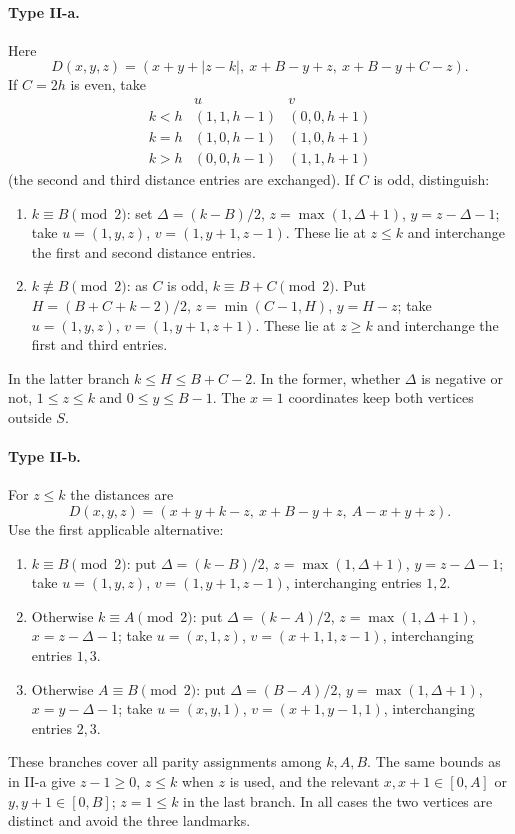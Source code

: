\documentclass[10pt,a4paper]{article}
\begin{document}
\paragraph{Type II-a.} Here
\[D(x,y,z)=(x+y+|z-k|,\ x+B-y+z,\ x+B-y+C-z).\]
If $C=2h$ is even, take
\[
\begin{array}{c|l|l}
 &u&v\\\hline
k<h&(1,1,h-1)&(0,0,h+1)\\
k=h&(1,0,h-1)&(1,0,h+1)\\
k>h&(0,0,h-1)&(1,1,h+1)
\end{array}
\]
(the second and third distance entries are exchanged). If $C$ is odd, distinguish:
\begin{enumerate}[label=(\roman*),leftmargin=2.2em]
\item $k\equiv B\pmod2$: set $\Delta=(k-B)/2$, $z=\max(1,\Delta+1)$, $y=z-\Delta-1$; take $u=(1,y,z)$, $v=(1,y+1,z-1)$. These lie at $z\le k$ and interchange the first and second distance entries.
\item $k\not\equiv B\pmod2$: as $C$ is odd, $k\equiv B+C\pmod2$. Put $H=(B+C+k-2)/2$, $z=\min(C-1,H)$, $y=H-z$; take $u=(1,y,z)$, $v=(1,y+1,z+1)$. These lie at $z\ge k$ and interchange the first and third entries.
\end{enumerate}
In the latter branch $k\le H\le B+C-2$. In the former, whether $\Delta$ is negative or not, $1\le z\le k$ and $0\le y\le B-1$. The $x=1$ coordinates keep both vertices outside $S$.

\paragraph{Type II-b.} For $z\le k$ the distances are
\[D(x,y,z)=(x+y+k-z,\ x+B-y+z,\ A-x+y+z).\]
Use the first applicable alternative:
\begin{enumerate}[label=(\roman*),leftmargin=2.2em]
\item $k\equiv B\pmod2$: put $\Delta=(k-B)/2$, $z=\max(1,\Delta+1)$, $y=z-\Delta-1$; take $u=(1,y,z)$, $v=(1,y+1,z-1)$, interchanging entries $1,2$.
\item Otherwise $k\equiv A\pmod2$: put $\Delta=(k-A)/2$, $z=\max(1,\Delta+1)$, $x=z-\Delta-1$; take $u=(x,1,z)$, $v=(x+1,1,z-1)$, interchanging entries $1,3$.
\item Otherwise $A\equiv B\pmod2$: put $\Delta=(B-A)/2$, $y=\max(1,\Delta+1)$, $x=y-\Delta-1$; take $u=(x,y,1)$, $v=(x+1,y-1,1)$, interchanging entries $2,3$.
\end{enumerate}
These branches cover all parity assignments among $k,A,B$. The same bounds as in II-a give $z-1\ge0$, $z\le k$ when $z$ is used, and the relevant $x,x+1\in[0,A]$ or $y,y+1\in[0,B]$; $z=1\le k$ in the last branch. In all cases the two vertices are distinct and avoid the three landmarks.
\end{document}
